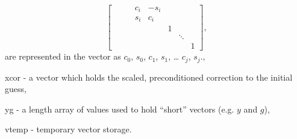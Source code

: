 \begin{args}
\begin{equation*}
\begin{bmatrix}
        &        &   & c_i & -s_i &   &        &   \\
        &        &   & s_i &  c_i &   &        &   \\
        &        &   &     &      & 1 &        &   \\
        &        &   &     &      &   & \ddots &   \\
        &        &   &     &      &   &        & 1\end{bmatrix},
    \end{equation*}
    are represented in the  vector as 
    $c_0$,  $s_0$,  $c_1$,
     $s_1$, \ldots {} $c_j$,
     $s_j$.,
  \item[xcor] - a vector which holds the scaled, preconditioned
    correction to the initial guess,
  \item[yg] - a length  array of  values
    used to hold ``short'' vectors (e.g. $y$ and $g$),
  \item[vtemp] - temporary vector storage.
\end{args}

